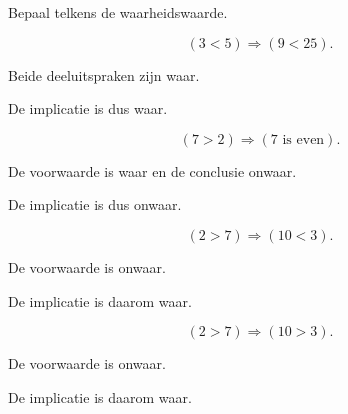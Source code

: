 \documentclass{ximera}
\begin{document}
\begin{oefening}{\oefB\ESS}

Bepaal telkens de waarheidswaarde.

\begin{question}

\[
(3<5)\Rightarrow(9<25).
\]

\begin{oplossing}

Beide deeluitspraken zijn waar.

De implicatie is dus waar.

\end{oplossing}

\end{question}


\begin{question}

\[
(7>2)\Rightarrow(7\text{ is even}).
\]

\begin{oplossing}

De voorwaarde is waar en de conclusie onwaar.

De implicatie is dus onwaar.

\end{oplossing}

\end{question}


\begin{question}

\[
(2>7)\Rightarrow(10<3).
\]

\begin{oplossing}

De voorwaarde is onwaar.

De implicatie is daarom waar.

\end{oplossing}

\end{question}


\begin{question}

\[
(2>7)\Rightarrow(10>3).
\]

\begin{oplossing}

De voorwaarde is onwaar.

De implicatie is daarom waar.

\end{oplossing}

\end{question}

\end{oefening}
\end{document}
